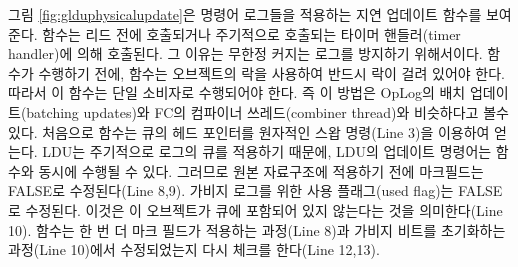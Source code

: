 그림 \ref{fig:glduphysicalupdate}은 명령어 로그들을 적용하는 지연 업데이트 함수를 보여준다. 
 함수는 리드 전에 호출되거나 주기적으로 호출되는 타이머 핸들러(timer handler)에 의해
호출된다. 
그 이유는 무한정 커지는 로그를 방지하기 위해서이다.
 함수가 수행하기 전에,  함수는 오브젝트의 락을 사용하여
반드시 락이 걸려 있어야 한다.
따라서 이 함수는 단일 소비자로 수행되어야 한다. 즉 이 방법은 OpLog의 배치
 업데이트(batching updates)와 FC의 컴파이너 쓰레드(combiner thread)와 비슷하다고 볼수 있다. 
처음으로  함수는 큐의 헤드 포인터를 원자적인 스왑 명령(Line 3)을 이용하여 
얻는다.
LDU는 주기적으로 로그의 큐를 적용하기 때문에, LDU의 업데이트 명령어는  함수와 
동시에 수행될 수 있다. 
그러므로 원본 자료구조에 적용하기 전에 마크필드는 FALSE로 수정된다(Line 8,9).
가비지 로그를 위한 사용 플래그(used flag)는 FALSE로 수정된다. 이것은 이 오브젝트가 큐에 포함되어 있지 
않는다는 것을 의미한다(Line 10).
 함수는 한 번 더 마크 필드가 적용하는 과정(Line 8)과 가비지 비트를 초기화하는 과정(Line
10)에서 수정되었는지 다시 체크를 한다(Line 12,13).

